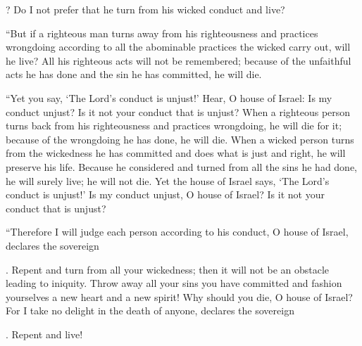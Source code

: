 {{}? Do I not
prefer that he turn
from his wicked conduct
and live?
\par }{\PP {}“But if a righteous
man turns away
from his righteousness
and practices
wrongdoing
according to all
the abominable
practices
the wicked
carry out,
will he live? All
his righteous
acts
will not
be remembered;
because
of the unfaithful acts
he has done
and the sin
he has committed,
he will die.
\par }{\PP {}“Yet you say,
‘The Lord’s
conduct
is unjust!’ Hear,
O house
of Israel: Is my conduct
unjust? Is it not
your conduct
that is unjust?
When a righteous
person turns back from his righteousness
and practices
wrongdoing,
he will die
for it;
because of the wrongdoing
he has
done,
he will die.
When
a wicked
person turns
from the wickedness
he has
committed
and does
what is just
and right,
he
will preserve
his life.
Because he considered
and turned
from all
the sins
he had
done,
he will surely
live;
he will not
die.
Yet the house
of Israel
says,
‘The Lord’s
conduct
is unjust!’ Is my conduct
unjust,
O house
of Israel? Is it not
your conduct
that is unjust?
\par }{\PP {}“Therefore
I will judge
each
person according to his conduct,
O house
of Israel,
declares
the sovereign

{}. Repent
and turn
from all
your wickedness;
then it will not
be
an obstacle
leading to iniquity.
Throw
away all
your sins
you have committed and fashion
yourselves a new
heart
and a new
spirit! Why
should you die,
O house
of Israel?
For
I take no
delight
in the death
of anyone, declares
the sovereign

{}. Repent
and live!

}
